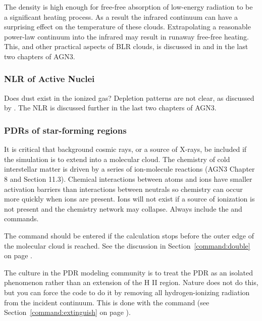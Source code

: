 \documentclass[12pt,twoside]{article}
\begin{document}
The density is high enough for free-free absorption of low-energy
radiation to be a significant heating process.
As a result the infrared
continuum can have a surprising effect on the temperature of these clouds.
Extrapolating a reasonable power-law continuum into the infrared may result
in runaway free-free heating.
This, and other practical aspects of BLR
clouds, is discussed in \citet{FerlandBLRCloudReview99}
and in the last two chapters of AGN3.

\subsubsection{NLR of Active Nuclei}

Does dust exist in the ionized gas?  Depletion patterns are not clear,
as discussed by \citet{FergusonEtAl97}.
The NLR is discussed further in the last two chapters of AGN3.

\subsubsection{PDRs of star-forming regions}

It is critical that background cosmic rays, or a source of X-rays, be
included if the simulation is to extend into a molecular cloud.  The
chemistry of cold interstellar matter is driven by a series of ion-molecule
reactions (AGN3 Chapter 8 and Section 11.3).  Chemical interactions between
atoms and ions have smaller activation barriers than interactions between
neutrals so chemistry can occur more quickly when ions are present.  Ions
will not exist if a source of ionization is not present and the chemistry
network may collapse.
Always include the  and  commands.

The  command should be
entered if the calculation stops before
the outer edge of the molecular cloud is reached.
See the discussion in Section~\ref{command:double}
on page \pageref{command:double}.

The culture in the PDR modeling community is to treat the PDR as an
isolated phenomenon rather than an extension of the H II region.  Nature
does not do this, but you can force the code to do it by removing all
hydrogen-ionizing radiation from the incident continuum.  This is done with
the  command
(see Section~\ref{command:extinguish} on page \pageref{command:extinguish}).
\end{document}
